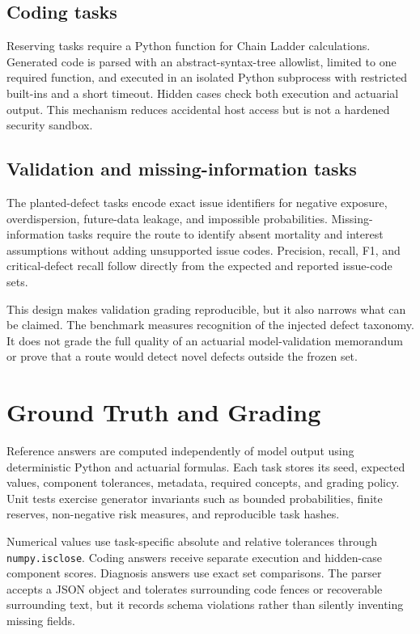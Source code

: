 \documentclass[11pt]{article}
\begin{document}
\subsection{Coding tasks}

Reserving tasks require a Python function for Chain Ladder calculations. Generated code is parsed with an abstract-syntax-tree allowlist, limited to one required function, and executed in an isolated Python subprocess with restricted built-ins and a short timeout. Hidden cases check both execution and actuarial output. This mechanism reduces accidental host access but is not a hardened security sandbox.

\subsection{Validation and missing-information tasks}

The planted-defect tasks encode exact issue identifiers for negative exposure, overdispersion, future-data leakage, and impossible probabilities. Missing-information tasks require the route to identify absent mortality and interest assumptions without adding unsupported issue codes. Precision, recall, F1, and critical-defect recall follow directly from the expected and reported issue-code sets.

This design makes validation grading reproducible, but it also narrows what can be claimed. The benchmark measures recognition of the injected defect taxonomy. It does not grade the full quality of an actuarial model-validation memorandum or prove that a route would detect novel defects outside the frozen set.

\section{Ground Truth and Grading}

Reference answers are computed independently of model output using deterministic Python and actuarial formulas. Each task stores its seed, expected values, component tolerances, metadata, required concepts, and grading policy. Unit tests exercise generator invariants such as bounded probabilities, finite reserves, non-negative risk measures, and reproducible task hashes.

Numerical values use task-specific absolute and relative tolerances through \texttt{numpy.isclose}. Coding answers receive separate execution and hidden-case component scores. Diagnosis answers use exact set comparisons. The parser accepts a JSON object and tolerates surrounding code fences or recoverable surrounding text, but it records schema violations rather than silently inventing missing fields.
\end{document}
